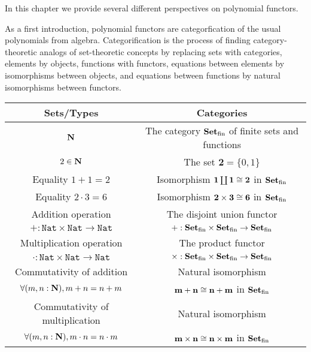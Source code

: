 
In this chapter we provide several different perspectives on polynomial functors.

As a first introduction, polynomial functors are categorfication of the usual polynomials from algebra. Categorification is the process of finding category-theoretic analogs of set-theoretic concepts by replacing sets with categories, elements by objects, functions with functors, equations between elements by isomorphisms between objects, and equations between functions by natural isomorphisms between functors.

\renewcommand{\arraystretch}{1.5}

\begin{table}[h]
  \centering
  \begin{tabular}{|c|c|}
    \hline
      \textbf{Sets/Types}  & \textbf{Categories} \\
      \hline
      $\mathbf{N}$ & The category $\mathbf{Set}_\mathrm{fin}$ of finite sets and functions \\
      \hline
      $2 \in \mathbf{N}$ & The set $\mathbf{2} = \{0, 1\}$\\
      \hline
      Equality $1 + 1 = 2$ &  Isomorphism $\mathbf{1} \coprod \mathbf{1} \cong \mathbf{2}$ in $\mathbf{Set}_\mathrm{fin}$ \\
      \hline
      Equality $2 \cdot 3 = 6$ &  Isomorphism $\mathbf{2} \times \mathbf{3} \cong \mathbf{6}$ in $\mathbf{Set}_\mathrm{fin}$ \\
      \hline
      Addition  operation
      &
      The disjoint union functor
      \\
      $+ : \mathtt{Nat} \times \mathtt{Nat} \to \mathtt{Nat}$ &
      $+ : \mathbf{Set}_\mathrm{fin} \times \mathbf{Set}_\mathrm{fin} \to \mathbf{Set}_\mathrm{fin}$ \\
      \hline
      Multiplication operation & The product functor \\
      $ \cdot : \mathtt{Nat} \times \mathtt{Nat} \to \mathtt{Nat}$
      &
       $\times : \mathbf{Set}_\mathrm{fin} \times \mathbf{Set}_\mathrm{fin} \to \mathbf{Set}_\mathrm{fin}$
      \\
      \hline
      Commutativity of addition  &     Natural isomorphism  \\
      $\forall (m, n : \mathbf{N}), m + n = n + m$ & $\mathbf{m} + \mathbf{n} \cong \mathbf{n} + \mathbf{m}$ in $\mathbf{Set}_\mathrm{fin}$ \\
      \hline
      Commutativity of multiplication  &     Natural isomorphism  \\
      $\forall (m, n : \mathbf{N}), m \cdot n = n \cdot m$ & $\mathbf{m} \times \mathbf{n} \cong \mathbf{n} \times \mathbf{m}$ in $\mathbf{Set}_\mathrm{fin}$ \\

\end{tabular}
\end{table}
